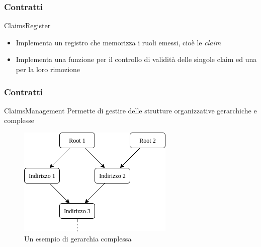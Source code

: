 \documentclass{beamer}
\begin{document}

\begin{frame}
\frametitle{Contratti}

\begin{block}{ClaimsRegister}
    \begin{itemize}
        \item Implementa un registro che memorizza i ruoli emessi, cioè le \emph{claim}
        \item Implementa una funzione per il controllo di validità delle singole claim ed una per la loro rimozione
    \end{itemize}
\end{block}

\end{frame}


\begin{frame}
\frametitle{Contratti}

\begin{block}{ClaimsManagement}
    Permette di gestire delle strutture organizzative gerarchiche e complesse
\end{block}

\begin{figure}[]
    \begin{minipage}[c]{0.5\textwidth}
        \centering
        \includegraphics[scale=2]{img/gerarchia.png}
    \end{minipage}\hfill
    \begin{minipage}[c]{0.5\textwidth}
        \caption{Un esempio di gerarchia complessa} \label{fig:03-03}
    \end{minipage}
\end{figure}

\end{frame}

\end{document}
